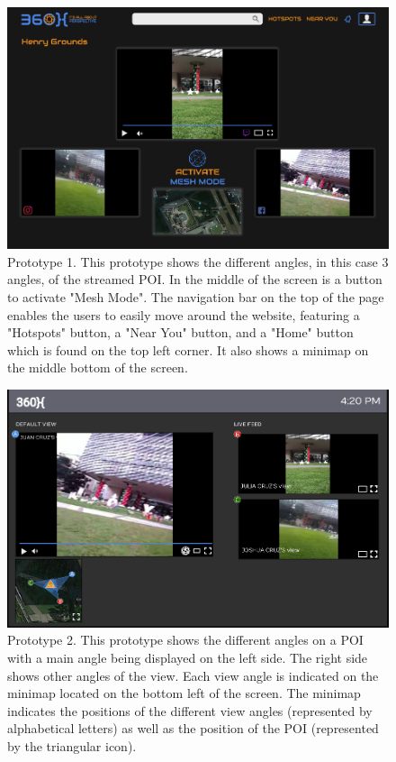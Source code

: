 \documentclass{sigchi}
\begin{document}
\begin{figure}[h]
    \centering
    \includegraphics[width = 1\linewidth]{figures/Prototype_1.png}
    \caption{Prototype 1. This prototype shows the different angles, in this case 3 angles, of the streamed POI. In the middle of the screen is a button to activate "Mesh Mode". The navigation bar on the top of the page enables the users to easily move around the website, featuring a "Hotspots" button, a "Near You" button, and a "Home" button which is found on the top left corner. It also shows a minimap on the middle bottom of the screen.}
    \label{fig:multiple}
\end{figure}
\begin{figure}[h]
    \centering
    \includegraphics[width = 1\linewidth]{figures/Prototype_2.png}
    \caption{Prototype 2. This prototype shows the different angles on a POI with a main angle being displayed on the left side. The right side shows other angles of the view. Each view angle is indicated on the minimap located on the bottom left of the screen. The minimap indicates the positions of the different view angles (represented by alphabetical letters) as well as the position of the POI (represented by the triangular icon).}
    \label{fig:multiple}
\end{figure}
\end{document}
